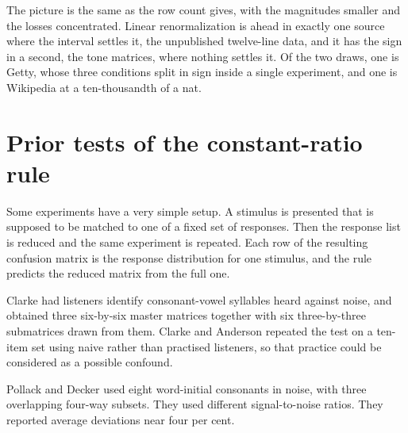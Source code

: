 \documentclass[11pt]{article}
\begin{document}

The picture is the same as the row count gives, with the magnitudes smaller and the losses
concentrated. Linear renormalization is ahead in exactly one source where the interval settles
it, the unpublished twelve-line data, and it has the sign in a second, the tone matrices, where
nothing settles it. Of the two draws, one is Getty, whose three conditions split in sign inside a
single experiment, and one is Wikipedia at a ten-thousandth of a nat.

\section{Prior tests of the constant-ratio rule}
\label{sec:prior}

Some experiments have a very simple setup. A stimulus is presented that is supposed to be matched
to one of a fixed set of responses. Then the response list is reduced and the same experiment is
repeated. Each row of the resulting confusion matrix is the response distribution for one
stimulus, and the rule predicts the reduced matrix from the full one.

Clarke had listeners identify consonant-vowel syllables heard against noise, and obtained three
six-by-six master matrices together with six three-by-three submatrices drawn from them. Clarke
and Anderson \cite{clarkeanderson1957} repeated the test on a ten-item set using naive rather
than practised listeners, so that practice could be considered as a possible confound.

Pollack and Decker \cite{pollackdecker1960} used eight word-initial consonants in noise, with
three overlapping four-way subsets. They used different signal-to-noise ratios. They reported
average deviations near four per cent.
\end{document}
